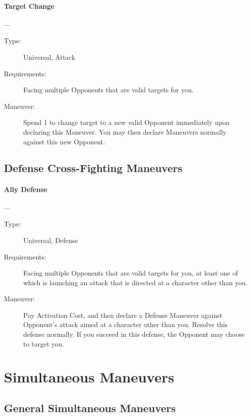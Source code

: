 \documentclass[oneside,11pt,english]{book}
\begin{document}
\paragraph{\large\label{man:Target Change}Target Change}---\quad{\large[1]}
\vspace{-10pt}\begin{description} 
\item [Type:] Universal, Attack 
\item [Requirements:] Facing multiple Opponents that are valid targets for you. 
\item [Maneuver:] Spend 1 to change target to a new valid Opponent immediately upon declaring this 
  Maneuver. You may then declare Maneuvers normally against this new Opponent. 
\end{description}
\subsection{Defense Cross-Fighting Maneuvers}
\paragraph{\large\label{man:Ally Defense}Ally Defense}---\quad{\large[2]}
\vspace{-10pt}\begin{description} 
\item [Type:] Universal, Defense 
\item [Requirements:] Facing multiple Opponents that are valid targets for you, at least one of which is 
  launching an attack that is directed at a character other than you. 
\item [Maneuver:] Pay Activation Cost, and then declare a Defense Maneuver against Opponent’s attack aimed 
  at a character other than you. Resolve this defense normally. If you succeed in this defense, the Opponent 
  may choose to target you. 
\end{description}

\section{Simultaneous Maneuvers}
\subsection{General Simultaneous Maneuvers}
\end{document}
